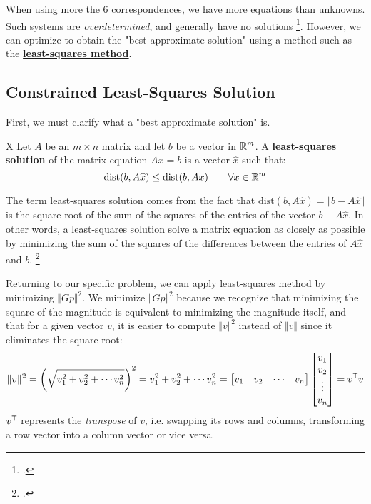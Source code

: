 When using more the 6 correspondences, we have more equations than unknowns. Such systems are \emph{overdetermined}, and generally have no solutions \footcite{williamsOverdeterminedSystems1990}. However, we can optimize to obtain the "best approximate solution" using a method such as the \hyperref[sec:clss]{\textbf{least-squares method}}. 

\subsection{Constrained Least-Squares Solution} \label{sec:clss}

First, we must clarify what a "best approximate solution" is. 
\begin{definition}X
    Let $A$ be an $m \times n$ matrix and let $b$ be a vector in $\mathbb{R}^m$. A \textbf{least-squares solution} of the matrix equation $Ax = b$ is a vector $\widehat{x}$ such that:
    \begin{equation*}
        \mathrm{dist}(b, A\widehat{x}) \leq \mathrm{dist}(b, Ax) \qquad \forall x \in \mathbb{R}^m
    \end{equation*}
\end{definition}

The term least-squares solution comes from the fact that $\mathrm{dist}(b, A\widehat{x})= \Vert b - A\widehat{x} \Vert$ is the square root of the sum of the squares of the entries of the vector $b - A\widehat{x}$. In other words, a least-squares solution solve a matrix equation as closely as possible by minimizing the sum of the squares of the differences between the entries of $A\widehat{x}$ and $b$. \footcite{margalitMethodLeast}

Returning to our specific problem, we can apply least-squares method by minimizing $\Vert Gp \Vert^2$. We minimize $\Vert Gp \Vert^2$ because we recognize that minimizing the square of the magnitude is equivalent to minimizing the magnitude itself, and that for a given vector $v$, it is easier to compute $\Vert v \Vert^2$ instead of $\Vert v \Vert$ since it eliminates the square root:
\begin{equation*}
    \Vert v \Vert^2
     = \left(\sqrt{v_1^2+v_2^2+ \cdots v_n^2}\right)^2 
     = v_1^2+v_2^2+ \cdots v_n^2 
     = \begin{bmatrix}
        v_1 & v_2 & \cdots & v_n
    \end{bmatrix}
    \begin{bmatrix}
        v_1 \\ v_2 \\ \vdots \\ v_n
    \end{bmatrix} 
     = v^{\mathsf{T}} v
\end{equation*}
$v^{\mathsf{T}}$ represents the \emph{transpose} of $v$, i.e. swapping its rows and columns, transforming a row vector into a column vector or vice versa.

